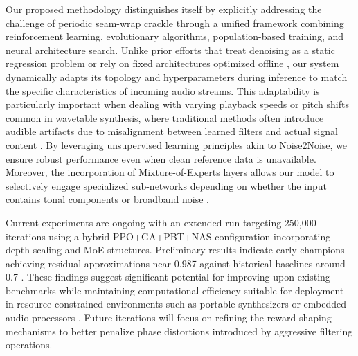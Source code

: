 Our proposed methodology distinguishes itself by explicitly addressing the challenge of periodic seam-wrap crackle through a unified framework combining reinforcement learning, evolutionary algorithms, population-based training, and neural architecture search\cite{jaderberg2017,khadka2018,real2019,schulman2017}. Unlike prior efforts that treat denoising as a static regression problem or rely on fixed architectures optimized offline \cite{elsken2019}, our system dynamically adapts its topology and hyperparameters during inference to match the specific characteristics of incoming audio streams. This adaptability is particularly important when dealing with varying playback speeds or pitch shifts common in wavetable synthesis, where traditional methods often introduce audible artifacts due to misalignment between learned filters and actual signal content \cite{engel2020}. By leveraging unsupervised learning principles akin to Noise2Noise\cite{lehtinen2018}, we ensure robust performance even when clean reference data is unavailable. Moreover, the incorporation of Mixture-of-Experts layers allows our model to selectively engage specialized sub-networks depending on whether the input contains tonal components or broadband noise \cite{shazeer2017}.

Current experiments are ongoing with an extended run targeting 250,000 iterations using a hybrid PPO+GA+PBT+NAS configuration incorporating depth scaling and MoE structures. Preliminary results indicate early champions achieving residual approximations near 0.987 against historical baselines around 0.7 \cite{stoller2018}. These findings suggest significant potential for improving upon existing benchmarks while maintaining computational efficiency suitable for deployment in resource-constrained environments such as portable synthesizers or embedded audio processors \cite{jaderberg2017}. Future iterations will focus on refining the reward shaping mechanisms to better penalize phase distortions introduced by aggressive filtering operations.
